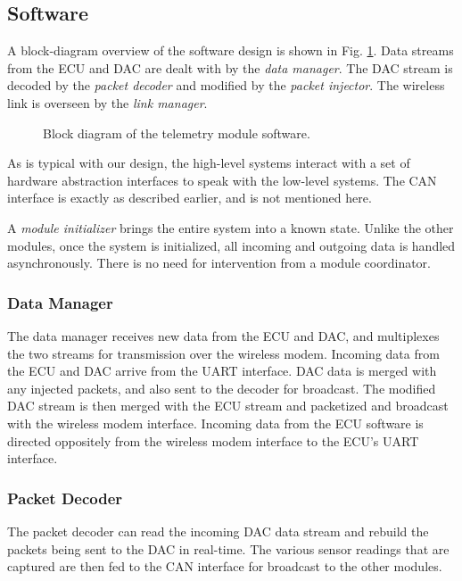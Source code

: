 \subsection{Software}
	
A block-diagram overview of the software design is shown in Fig. \ref{fig:telemetry_software_block}. Data streams from the ECU and DAC are dealt with by the \emph{data manager}. The DAC stream is decoded by the \emph{packet decoder} and modified by the \emph{packet injector}. The wireless link is overseen by the \emph{link manager}. 

\begin{figure}[H]
	\centering
	
	\caption{Block diagram of the telemetry module software.}
	\label{fig:telemetry_software_block}
\end{figure}

As is typical with our design, the high-level systems interact with a set of hardware abstraction interfaces to speak with the low-level systems. The CAN interface is exactly as described earlier, and is not mentioned here.

A \emph{module initializer} brings the entire system into a known state. Unlike the other modules, once the system is initialized, all incoming and outgoing data is handled asynchronously. There is no need for intervention from a module coordinator. 

\subsubsection{Data Manager}

The data manager receives new data from the ECU and DAC, and multiplexes the two streams for transmission over the wireless modem. Incoming data from the ECU and DAC arrive from the UART interface. DAC data is merged with any injected packets, and also sent to the decoder for broadcast. The modified DAC stream is then merged with the ECU stream and packetized and broadcast with the wireless modem interface. Incoming data from the ECU software is directed oppositely from the wireless modem interface to the ECU's UART interface.

\subsubsection{Packet Decoder}
\label{sec:design_telemetry_decoder}

The packet decoder can read the incoming DAC data stream and rebuild the packets being sent to the DAC in real-time. The various sensor readings that are captured are then fed to the CAN interface for broadcast to the other modules.

